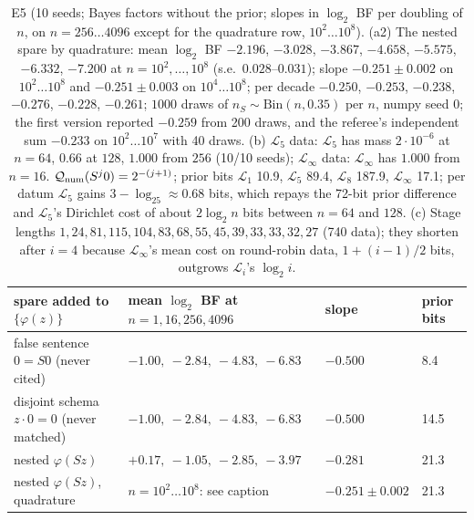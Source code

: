 \begin{table}[ht]
\centering\footnotesize
\begin{tabular}{@{}llll@{}}
\toprule
spare added to $\{\varphi(z)\}$ & mean $\log_2$ BF at $n=1,16,256,4096$ & slope & prior bits\\
\midrule
false sentence $0=S0$ (never cited) & $-1.00,\ -2.84,\ -4.83,\ -6.83$ & $-0.500$ & 8.4\\
disjoint schema $z\cdot0=0$ (never matched) & $-1.00,\ -2.84,\ -4.83,\ -6.83$ & $-0.500$ & 14.5\\
nested $\varphi(Sz)$ & $+0.17,\ -1.05,\ -2.85,\ -3.97$ & $-0.281$ & 21.3\\
\midrule
nested $\varphi(Sz)$, quadrature & $n=10^2\ldots10^8$: see caption & $-0.251\pm0.002$ & 21.3\\
\bottomrule
\end{tabular}
\caption{E5 (10 seeds; Bayes factors without the prior; slopes in $\log_2$ BF per doubling of $n$, on $n=256\ldots4096$ except for the quadrature row, $10^2\ldots10^8$). (a2) The nested spare by quadrature: mean $\log_2$ BF $-2.196$, $-3.028$, $-3.867$, $-4.658$, $-5.575$, $-6.332$, $-7.200$ at $n=10^2,\dots,10^8$ (s.e.\ $0.028$--$0.031$); slope $-0.251\pm0.002$ on $10^2\ldots10^8$ and $-0.251\pm0.003$ on $10^4\ldots10^8$; per decade $-0.250$, $-0.253$, $-0.238$, $-0.276$, $-0.228$, $-0.261$; $1000$ draws of $n_S\sim\mathrm{Bin}(n,0.35)$ per $n$, numpy seed 0; the first version reported $-0.259$ from 200 draws, and the referee's independent sum $-0.233$ on $10^2\ldots10^7$ with 40 draws. (b) $\mathcal L_5$ data: $\mathcal L_5$ has mass $2\cdot10^{-6}$ at $n=64$, $0.66$ at $128$, $1.000$ from $256$ (10/10 seeds); $\mathcal L_\infty$ data: $\mathcal L_\infty$ has $1.000$ from $n=16$. $\mathcal{Q}_{\mathrm{num}}(S^j0)=2^{-(j+1)}$; prior bits $\mathcal L_1$ 10.9, $\mathcal L_5$ 89.4, $\mathcal L_8$ 187.9, $\mathcal L_\infty$ 17.1; per datum $\mathcal L_5$ gains $3-\log_25\approx0.68$ bits, which repays the 72-bit prior difference and $\mathcal L_5$'s Dirichlet cost of about $2\log_2n$ bits between $n=64$ and $128$. (c) Stage lengths $1,24,81,115,104,83,68,55,45,39,33,33,32,27$ (740 data); they shorten after $i=4$ because $\mathcal L_\infty$'s mean cost on round-robin data, $1+(i-1)/2$ bits, outgrows $\mathcal L_i$'s $\log_2i$.}
\label{tab:exp:e5}
\end{table}

